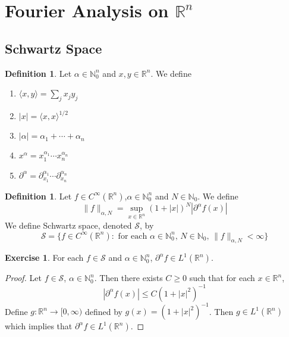 \documentclass[12pt]{amsart}
\theoremstyle{definition}
\newtheorem{defn}[definition]{Definition}
\newtheorem{ex}[definition]{Exercise}
\newcommand{\p}{\partial}
\newcommand{\al}{\alpha}
\newcommand{\N}{\mathbb{N}}
\newcommand{\R}{\mathbb{R}}
\newcommand{\MS}{\mathcal{S}}
\renewcommand{\r}{\rangle}
\renewcommand{\l}{\langle}
\newcommand{\Rg}{[0,\infty)}
\newcommand{\lex}[1]{\label{ex:#1}}
\newcommand{\ld}[1]{\label{defn:#1}}
\begin{document}
	
	
	
	
	
	
	
	
	
	
	
	
	
	
	
	
	
	
	
	
	\newpage
	\section{Fourier Analysis on $\R^n$}	

	\subsection{Schwartz Space}
	\begin{defn}
	\ld{100} Let $\al \in \N_0^n$ and $x, y \in \R^n$. We define 
	\begin{enumerate}
	\item $\l x , y\r  = \sum_{j}x_jy_j$
	\item $|x| = \l x, x\r^{1/2}$
	\item $|\al| = \al_1 + \cdots + \al_n$
	\item $x^\al = x_1^{\al_1}\cdots x_n^{\al_n}$
	\item $\p^{\al} = \p_{x_1}^{\al_1} \cdots \p_{x_n}^{\al_n}$
	\end{enumerate}
	\end{defn}	
	
	\begin{defn}
	\ld{101} Let $f \in C^{\infty}(\R^n)$,$\al \in \N_0^n$ and $N \in \N_0$. We define $$\|f\|_{\al, N} = \sup_{x \in \R^n} (1 + |x|)^N |\p^{\al}f (x) |$$
	We define Schwartz space, denoted $\MS$, by $$\MS = \{f \in C^{\infty}(\R^n): \text{ for each $\al \in \N_0^n$, $N \in \N_0$, } \|f\|_{\al, N} < \infty\}$$
	\end{defn}
	
	\begin{ex}
	\lex{102} For each $f \in \MS$ and $\al \in \N_0^n$, $\p^\al f \in L^1(\R^n)$.
	\end{ex}
	
	\begin{proof}
	Let $f \in \MS$, $\al \in \N_0^n$. Then there exists $C \geq 0$ such that for each $x \in \R^n$, $$| \p^{\al} f(x)| \leq C(1+|x|^{2})^{-1}$$
	Define $g:\R^n \rightarrow \Rg$ defined by $g(x) = (1+|x|^{2})^{-1}$. Then $g \in L^1(\R^n)$ which implies that $\p^{\al} f \in L^1(\R^n)$.
	\end{proof}
	
\end{document}
